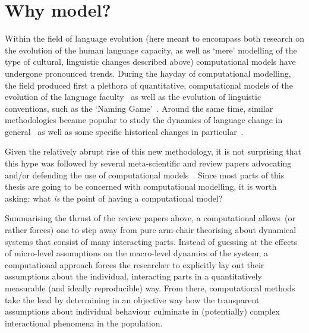 \section{Why model?}

Within the field of language evolution (here meant to encompass both research on the evolution of the human language capacity, as well as `mere' modelling of the type of cultural, linguistic changes described above) computational models have undergone pronounced trends. %
During the hayday of computational modelling, the field produced first a plethora of quantitative, computational models of the evolution of the language faculty~\citep{Kirby1999,Nowak2001a} as well as the evolution of linguistic conventions, such as the `Naming Game'~\citep[see \citet{Wellens2012} for a review]{Baronchelli2008}. Around the same time, similar methodologies became popular to study the dynamics of language change in general~\citep{Niyogi1995,Niyogi1997,Livingstone2000,Niyogi2006,Wedel2006,Baxter2006,Wedel2007,Niyogi2007,Fagyal2010,Blythe2012,Gong2012,Pierrehumbert2014} as well as some specific historical changes in particular~\citep{Baxter2009,Sonderegger2010,Swarup2012,Kirby2013,Kirby2013cogsci}. %


Given the relatively abrupt rise of this new methodology, it is not surprising that this hype was followed by several meta-scientific and review papers advocating and/or defending the use of computational models~\citep{DeBoer2006,Baker2008,Jaeger2009,Hruschka2009,Vogt2010,DeBoer2012EvoLang}. Since most parts of this thesis are going to be concerned with computational modelling, it is worth asking: what \emph{is} the point of having a computational model?

Summarising the thrust of the review papers above, a computational allows~(or rather forces) one to step away from pure arm-chair theorising about dynamical systems that consist of many interacting parts. Instead of guessing at the effects of micro-level assumptions on the macro-level dynamics of the system, a computational approach forces the researcher to explicitly lay out their assumptions about the individual, interacting parts in a quantitatively measurable (and ideally reproducible) way. From there, computational methods take the lead by determining in an objective way how the transparent assumptions about individual behaviour culminate in (potentially) complex interactional phenomena in the population.

